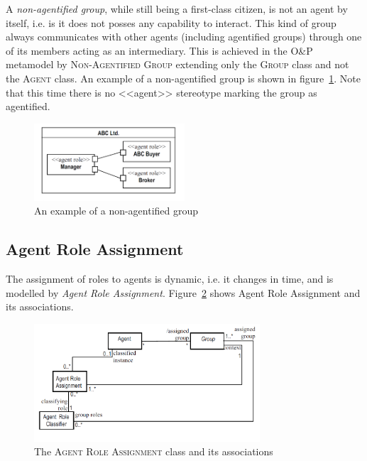 A \textit{non-agentified group}, while still being a first-class citizen, is not an agent by itself, i.e. is it does not posses any capability to interact.
This kind of group always communicates with other agents (including agentified groups) through one of its members acting as an intermediary.
This is achieved in the O\&P metamodel by \textsc{Non-Agentified Group} extending only the \textsc{Group} class and not the \textsc{Agent} class.
An example of a non-agentified group is shown in figure~\ref{figure:onp-non-agentified-group}.
Note that this time there is no <<agent>> stereotype marking the group as agentified.

\begin{figure}[h]
	\centering
	\includegraphics[width=0.5\textwidth]{images/onp-non-agentified-group.png}
	\caption{An example of a non-agentified group}
	\label{figure:onp-non-agentified-group}
\end{figure}

\subsection{Agent Role Assignment}

The assignment of roles to agents is dynamic, i.e. it changes in time, and is modelled by \textit{Agent Role Assignment}.
Figure~\ref{figure:onp-agent-role-assignment} shows Agent Role Assignment and its associations.  

\begin{figure}[h]
	\centering
	\includegraphics[width=0.75\textwidth]{images/onp-agent-role-assignment.png}
	\caption{The \textsc{Agent Role Assignment} class and its associations}
	\label{figure:onp-agent-role-assignment}
\end{figure}

